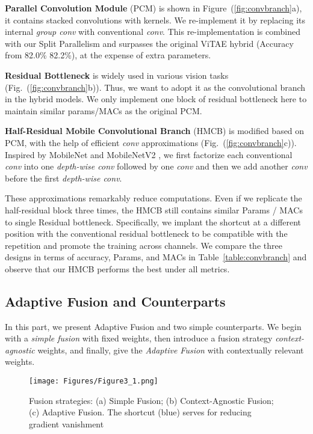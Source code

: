 \documentclass[lettersize,journal]{IEEEtran}
\begin{document}
\textbf{Parallel Convolution Module} (PCM) is shown in Figure~(\ref{fig:convbranch}a), it contains stacked convolutions with  kernels. We re-implement it by replacing its internal \textit{group conv} with conventional \textit{conv}. 
This re-implementation is combined with our Split Parallelism and surpasses the original ViTAE hybrid (Accuracy from 82.0\%  82.2\%), at the expense of extra parameters.

\textbf{Residual Bottleneck} is widely used in various vision tasks (Fig.~(\ref{fig:convbranch}b)). Thus, we want to adopt it as the convolutional branch in the hybrid models. We only implement one block of residual bottleneck here to maintain similar params/MACs as the original PCM.


\textbf{Half-Residual Mobile Convolutional Branch} (HMCB) is modified based on PCM, with the help of efficient \textit{conv} approximations (Fig.~(\ref{fig:convbranch}c)). Inspired by MobileNet \cite{howard2017mobilenets} and MobileNetV2 \cite{Sandler2018MobileNetV2IR}, 
we first factorize each conventional  \textit{conv} into one  \textit{depth-wise conv} followed by one  \textit{conv} and then we add another  \textit{conv} before the first \textit{depth-wise conv}.


These approximations remarkably reduce computations. Even if we replicate the half-residual block three times, the HMCB still contains similar Params / MACs to single Residual bottleneck. Specifically, we implant the shortcut at a different position with the conventional residual bottleneck to be compatible with the repetition and promote the training across channels. We compare the three designs in terms of accuracy, Params, and MACs in Table~\ref{table:convbranch} and observe that our HMCB performs the best under all metrics.

\subsection{Adaptive Fusion and Counterparts}
\label{sec:adaptive}
In this part, we present Adaptive Fusion and two simple counterparts. We begin with a \textit{simple fusion} with fixed weights, then introduce a fusion strategy \textit{context-agnostic} weights, and finally, give the \textit{Adaptive Fusion} with contextually relevant weights.

\begin{figure}
\centering
\texttt{[image: Figures/Figure3\_1.png]}
\caption{Fusion strategies: (a) Simple Fusion; (b) Context-Agnostic Fusion; (c) Adaptive Fusion. The shortcut ({\color{blue}blue}) serves for reducing gradient vanishment}
\label{fig:fusion}
\end{figure}
\end{document}

